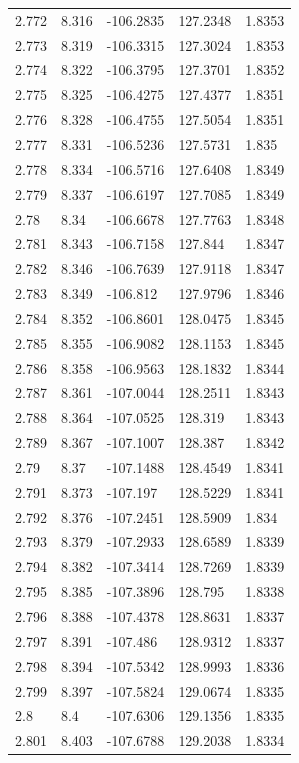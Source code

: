 \begin{tabular}{lllll}
2.772 & 8.316 & -106.2835 & 127.2348 & 1.8353 \\
2.773 & 8.319 & -106.3315 & 127.3024 & 1.8353 \\
2.774 & 8.322 & -106.3795 & 127.3701 & 1.8352 \\
2.775 & 8.325 & -106.4275 & 127.4377 & 1.8351 \\
2.776 & 8.328 & -106.4755 & 127.5054 & 1.8351 \\
2.777 & 8.331 & -106.5236 & 127.5731 & 1.835 \\
2.778 & 8.334 & -106.5716 & 127.6408 & 1.8349 \\
2.779 & 8.337 & -106.6197 & 127.7085 & 1.8349 \\
2.78 & 8.34 & -106.6678 & 127.7763 & 1.8348 \\
2.781 & 8.343 & -106.7158 & 127.844 & 1.8347 \\
2.782 & 8.346 & -106.7639 & 127.9118 & 1.8347 \\
2.783 & 8.349 & -106.812 & 127.9796 & 1.8346 \\
2.784 & 8.352 & -106.8601 & 128.0475 & 1.8345 \\
2.785 & 8.355 & -106.9082 & 128.1153 & 1.8345 \\
2.786 & 8.358 & -106.9563 & 128.1832 & 1.8344 \\
2.787 & 8.361 & -107.0044 & 128.2511 & 1.8343 \\
2.788 & 8.364 & -107.0525 & 128.319 & 1.8343 \\
2.789 & 8.367 & -107.1007 & 128.387 & 1.8342 \\
2.79 & 8.37 & -107.1488 & 128.4549 & 1.8341 \\
2.791 & 8.373 & -107.197 & 128.5229 & 1.8341 \\
2.792 & 8.376 & -107.2451 & 128.5909 & 1.834 \\
2.793 & 8.379 & -107.2933 & 128.6589 & 1.8339 \\
2.794 & 8.382 & -107.3414 & 128.7269 & 1.8339 \\
2.795 & 8.385 & -107.3896 & 128.795 & 1.8338 \\
2.796 & 8.388 & -107.4378 & 128.8631 & 1.8337 \\
2.797 & 8.391 & -107.486 & 128.9312 & 1.8337 \\
2.798 & 8.394 & -107.5342 & 128.9993 & 1.8336 \\
2.799 & 8.397 & -107.5824 & 129.0674 & 1.8335 \\
2.8 & 8.4 & -107.6306 & 129.1356 & 1.8335 \\
2.801 & 8.403 & -107.6788 & 129.2038 & 1.8334 \\

\end{tabular}
